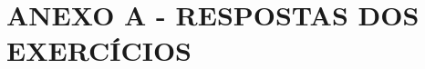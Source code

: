 \renewcommand{\thechapter}{}%
\chapter{ANEXO A - RESPOSTAS DOS EXERCÍCIOS} %
\label{anexoA} %
\renewcommand{\thechapter}{A}%

\tcbinputrecords